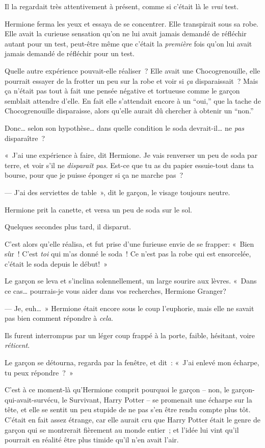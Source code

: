 Il la regardait très attentivement à présent, comme si c'était là le \emph{vrai} test.

Hermione ferma les yeux et essaya de se concentrer.
Elle transpirait sous sa robe.
Elle avait la curieuse sensation qu'on ne lui avait jamais demandé de réfléchir autant pour un test, peut-être même que c'était la \emph{première} fois qu'on lui avait jamais demandé de réfléchir pour un test.

Quelle autre expérience pouvait-elle réaliser~?
Elle avait une Chocogrenouille, elle pourrait essayer de la frotter un peu sur la robe et voir si \emph{ça} disparaissait~?
Mais ça n'était pas tout à fait une pensée négative et tortueuse comme le garçon semblait attendre d'elle.
En fait elle s'attendait encore à un “oui,” que la tache de Chocogrenouille disparaisse, alors qu'elle aurait dû chercher à obtenir un “non.”

Donc… selon son hypothèse… dans quelle condition le soda devrait-il… ne \emph{pas} disparaître~?

«~J'ai une expérience à faire, dit Hermione.
Je vais renverser un peu de soda par terre, et voir s'il ne \emph{disparaît pas}.
Est-ce que tu as du papier essuie-tout dans ta bourse, pour que je puisse éponger si ça ne marche pas~?

--- J'ai des serviettes de table~», dit le garçon, le visage toujours neutre.

Hermione prit la canette, et versa un peu de soda sur le sol.

Quelques secondes plus tard, il disparut.

C'est alors qu'elle réalisa, et fut prise d'une furieuse envie de se frapper:
«~Bien sûr~! C'est \emph{toi } qui m'as donné le soda~!
Ce n'est pas la robe qui est ensorcelée, c'était le soda depuis le début!~»

Le garçon se leva et s'inclina solennellement, un large sourire aux lèvres.
«~Dans ce cas… pourrais-je vous aider dans vos recherches, Hermione Granger?

--- Je, euh…~» Hermione était encore sous le coup l'euphorie, mais elle ne savait pas bien comment répondre à \emph{cela}.

Ils furent interrompus par un léger coup frappé à la porte, faible, hésitant, voire \emph{réticent}.

Le garçon se détourna, regarda par la fenêtre, et dit~: «~J'ai enlevé mon écharpe, tu peux répondre~?~»

C'est à ce moment-là qu'Hermione comprit pourquoi le garçon -- non, le garçon-qui-avait-survécu, le Survivant, Harry Potter -- se promenait une écharpe sur la tête, et elle se sentit un peu stupide de ne pas s'en être rendu compte plus tôt.
C'était en fait assez étrange, car elle aurait cru que Harry Potter était le genre de garçon qui se montrerait fièrement au monde entier~; et l'idée lui vint qu'il pourrait en réalité être plus timide qu'il n'en avait l'air.

